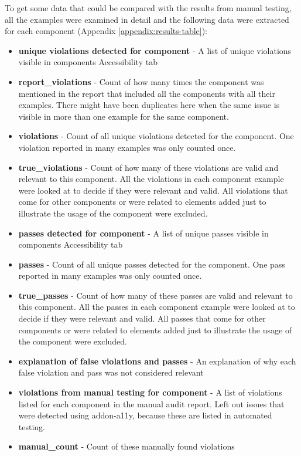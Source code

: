 \documentclass{master_thesis}
\begin{document}
To get some data that could be compared with the results from manual testing, all the examples were examined in detail and the following data were extracted for each component (Appendix \ref{appendix:results-table}):
\begin{itemize}
	\item \textbf{unique violations detected for component} - A list of unique violations visible in components Accessibility tab
	\item \textbf{report\_violations} - Count of how many times the component was mentioned in the report that included all the components with all their examples. There might have been duplicates here when the same issue is visible in more than one example for the same component.
	\item \textbf{violations} - Count of all unique violations detected for the component. One violation reported in many examples was only counted once.
	\item \textbf{true\_violations} - Count of how many of these violations are valid and relevant to this component. All the violations in each component example were looked at to decide if they were relevant and valid. All violations that come for other components or were related to elements added just to illustrate the usage of the component were excluded.
	\item \textbf{passes detected for component} - A list of unique passes visible in components Accessibility tab
	\item \textbf{passes} - Count of all unique passes detected for the component. One pass reported in many examples was only counted once.
	\item \textbf{true\_passes} - Count of how many of these passes are valid and relevant to this component. All the passes in each component example were looked at to decide if they were relevant and valid. All passes that come for other components or were related to elements added just to illustrate the usage of the component were excluded.
	\item \textbf{explanation of false violations and passes} - An explanation of why each false violation and pass was not considered relevant
	\item \textbf{violations from manual testing for component} - A list of violations listed for each component in the manual audit report. Left out issues that were detected using addon-a11y, because these are listed in automated testing.
	\item \textbf{manual\_count} - Count of these manually found violations
\end{itemize}
\end{document}
